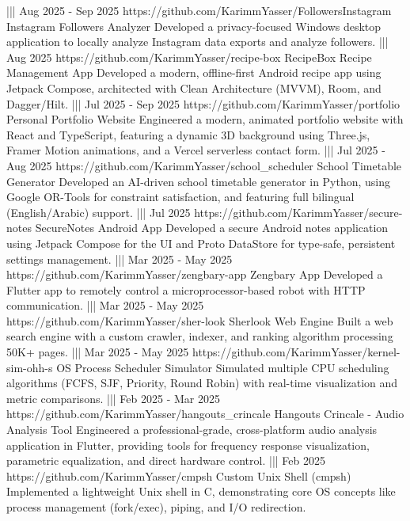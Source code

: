 {    |||
    {Aug 2025 - Sep 2025}%
    {https://github.com/KarimmYasser/FollowersInstagram}%
    {Instagram Followers Analyzer}%
    {Developed a privacy-focused Windows desktop application to locally analyze Instagram data exports and analyze followers.}%
    |||
    {Aug 2025}%
    {https://github.com/KarimmYasser/recipe-box}%
    {RecipeBox Recipe Management App}%
    {Developed a modern, offline-first Android recipe app using Jetpack Compose, architected with Clean Architecture (MVVM), Room, and Dagger/Hilt.}%
    |||
    {Jul 2025 - Sep 2025}%
    {https://github.com/KarimmYasser/portfolio}%
    {Personal Portfolio Website}%
    {Engineered a modern, animated portfolio website with React and TypeScript, featuring a dynamic 3D background using Three.js, Framer Motion animations, and a Vercel serverless contact form.}%
    |||
    {Jul 2025 - Aug 2025}%
    {https://github.com/KarimmYasser/school_scheduler}%
    {School Timetable Generator}%
    {Developed an AI-driven school timetable generator in Python, using Google OR-Tools for constraint satisfaction, and featuring full bilingual (English/Arabic) support.}%
    |||
    {Jul 2025}%
    {https://github.com/KarimmYasser/secure-notes}%
    {SecureNotes Android App}%
    {Developed a secure Android notes application using Jetpack Compose for the UI and Proto DataStore for type-safe, persistent settings management.}%
    |||
    {Mar 2025 - May 2025}%
    {https://github.com/KarimmYasser/zengbary-app}%
    {Zengbary App}%
    {Developed a Flutter app to remotely control a microprocessor-based robot with HTTP communication.}%
    |||
    {Mar 2025 - May 2025}%
    {https://github.com/KarimmYasser/sher-look}%
    {Sherlook Web Engine}%
    {Built a web search engine with a custom crawler, indexer, and ranking algorithm processing 50K+ pages.}%
    |||
    {Mar 2025 - May 2025}%
    {https://github.com/KarimmYasser/kernel-sim-ohh-s}%
    {OS Process Scheduler Simulator}%
    {Simulated multiple CPU scheduling algorithms (FCFS, SJF, Priority, Round Robin) with real-time visualization and metric comparisons.}%
    |||
    {Feb 2025 - Mar 2025}%
    {https://github.com/KarimmYasser/hangouts_crincale}%
    {Hangouts Crincale - Audio Analysis Tool}%
    {Engineered a professional-grade, cross-platform audio analysis application in Flutter, providing tools for frequency response visualization, parametric equalization, and direct hardware control.}%
    |||
    {Feb 2025}%
    {https://github.com/KarimmYasser/cmpsh}%
    {Custom Unix Shell (cmpsh)}%
    {Implemented a lightweight Unix shell in C, demonstrating core OS concepts like process management (fork/exec), piping, and I/O redirection.}%
}
